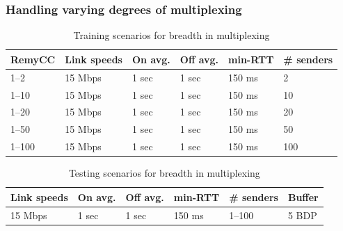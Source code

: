 \begin{frame}
\frametitle{Handling varying degrees of multiplexing}
\begin{table}
\begin{center}
\begin{scriptsize}
\begin{tabular}{l|l|l|l|l|l}
\bf RemyCC & \bf Link speeds & \bf On avg. & \bf Off avg. & \bf min-RTT &
\bf \# senders \\
\hline
1--2     & 15 Mbps & 1 sec & 1 sec & 150 ms & 2 \\
1--10    & 15 Mbps & 1 sec & 1 sec & 150 ms & 10 \\
1--20    & 15 Mbps & 1 sec & 1 sec & 150 ms & 20 \\
1--50    & 15 Mbps & 1 sec & 1 sec & 150 ms & 50 \\
1--100   & 15 Mbps & 1 sec & 1 sec & 150 ms & 100 \\
\end{tabular}
\end{scriptsize}
\caption{Training scenarios for breadth in multiplexing}
\label{table:multiplexing}
\end{center}
\end{table}

\begin{table}
\begin{center}
\begin{scriptsize}
\begin{tabular}{l|l|l|l|l|l}
\bf Link speeds & \bf On avg. & \bf Off avg. & \bf min-RTT &
\bf \# senders & Buffer \\
\hline
15 Mbps & 1 sec & 1 sec & 150 ms & 1--100 & 5 BDP\\
\end{tabular}
\end{scriptsize}
\caption{Testing scenarios for breadth in multiplexing}
\label{table:muxtesting}
\end{center}
\end{table}

\end{frame}

